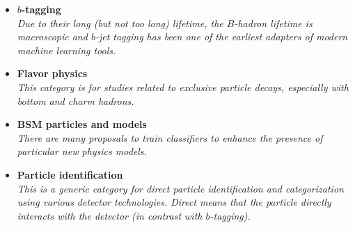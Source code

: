 \documentclass[12pt,letterpaper]{article}
\begin{document}
\begin{itemize}
\begin{itemize}
\begin{itemize}
			\item \textbf{$b$-tagging}~\cite{Sirunyan:2017ezt,Guest:2016iqz,Keck:2018lcd,bielkov2020identifying,Bols:2020bkb,ATL-PHYS-PUB-2017-003,ATL-PHYS-PUB-2020-014,Liao:2022ufk,Stein:2023cnt,ATLAS:2023gog}
			\\\textit{Due to their long (but not too long) lifetime, the $B$-hadron lifetime is macroscopic and $b$-jet tagging has been one of the earliest adapters of modern machine learning tools.}
			\item \textbf{Flavor physics}~\cite{1811097,Bahtiyar:2022une,Zhang:2023czx,Nishimura:2023wdu,Smith:2023ssh}
			\\\textit{This category is for studies related to exclusive particle decays, especially with bottom and charm hadrons.}
			\item \textbf{BSM particles and models}~\cite{Datta:2019ndh,Baldi:2014kfa,Chakraborty:2019imr,10.1088/2632-2153/ab9023,1792136,1801423,Chang:2020rtc,Cogollo:2020afo,Grossi:2020orx,Ngairangbam:2020ksz,Englert:2020ntw,Freitas:2020ttd,Khosa:2019kxd,Freitas:2019hbk,Stakia:2021pvp,Arganda:2021azw,Jorge:2021vpo,Ren:2021prq,Barron:2021btf,Yang:2021gge,Alvestad:2021sje,Morais:2021ead,Jung:2021tym,Drees:2021oew,Cornell:2021gut,Vidal:2021oed,Beauchesne:2021qrw,Feng:2021eke,Konar:2022bgc,Badea:2022dzb,Freitas:2022cno,Goodsell:2022beo,Lv:2022pme,Ai:2022qvs,Yang:2022fhw,Alasfar:2022vqw,Barbosa:2022mmw,Chiang:2022lsn,Hall:2022bme,Faucett:2022zie,Bhattacharya:2022kje,Bardhan:2022sif,Bhattacharyya:2022umc,ATLAS:2022ihe,CMS:2022idi,Ballabene:2022fms,ATLAS:2023mcc,Palit:2023dvs,Liu:2023gpt,Pedro:2023sdp,MB:2023edk,Dong:2023nir,Guo:2023jkz,Lu:2023gjk,Flacke:2023eil,Bardhan:2023mia,Aguilar-Saavedra:2023pde,Cremer:2023gne,Esmail:2023axd,Choudhury:2023eje,Bhattacherjee:2023evs,Grefsrud:2023dad,Wang:2023pqx}
			\\\textit{There are many proposals to train classifiers to enhance the presence of particular new physics models.}
			\item \textbf{Particle identification}~\cite{deOliveira:2018lqd,Paganini:DLPS2017,Hooberman:DLPS2017,Keck:2018lcd,Belayneh:2019vyx,Qasim:2019otl,Collado:2020fwm,Verma:2021ixg,Graziani:2021vai,Graczykowski:2022zae,Fanelli:2022ifa,Dimitrova:2022uum,Ryzhikov:2022lbu,Kushawaha:2023dms,Wu:2023pzn,Prasad:2023zdd,Lange:2023gbe,Novosel:2023cki,Charan:2023ldg,NA62:2023wzm,Karwowska:2023dhl,Song:2023ceh}
			\\\textit{This is a generic category for direct particle identification and categorization using various detector technologies.  Direct means that the particle directly interacts with the detector (in contrast with $b$-tagging).}

\end{itemize}
\end{itemize}
\end{itemize}
\end{document}
